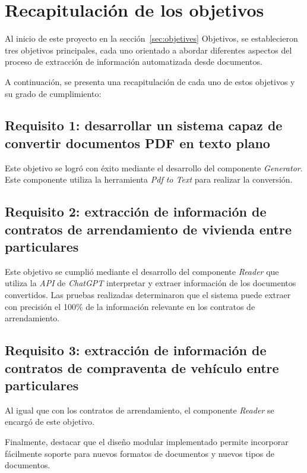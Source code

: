 \section{Recapitulación de los objetivos}

Al inicio de este proyecto en la sección~\ref{sec:objetives} Objetivos, se establecieron tres objetivos principales,
cada uno orientado a abordar diferentes aspectos del proceso de extracción de información automatizada desde documentos.

A continuación, se presenta una recapitulación de cada uno de estos objetivos y su grado de cumplimiento:

\subsection*{Requisito 1: desarrollar un sistema capaz de convertir documentos PDF en texto plano}

Este objetivo se logró con éxito mediante el desarrollo del componente \textit{Generator}.
Este componente utiliza la herramienta \textit{Pdf to Text} para realizar la conversión.

\subsection*{Requisito 2: extracción de información de contratos de arrendamiento de vivienda entre particulares}

Este objetivo se cumplió mediante el desarrollo del componente \textit{Reader} que utiliza la \textit{API}
de \textit{ChatGPT} interpretar y extraer información de los documentos convertidos.
Las pruebas realizadas determinaron que el sistema puede extraer con precisión el 100\% de la información relevante
en los contratos de arrendamiento.

\subsection*{Requisito 3: extracción de información de contratos de compraventa de vehículo entre particulares}

Al igual que con los contratos de arrendamiento, el componente \textit{Reader} se encargó de este objetivo.

Finalmente, destacar que el diseño modular implementado permite incorporar fácilmente soporte para nuevos formatos de
documentos y nuevos tipos de documentos.